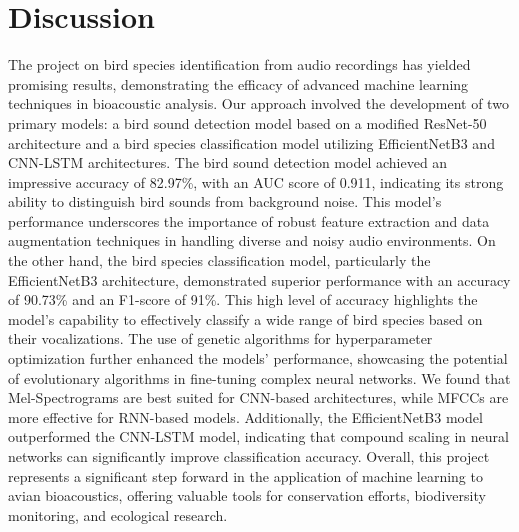 \newpage

\chapter{Discussion}
The project on bird species identification from audio recordings has yielded promising results, demonstrating the efficacy of advanced machine learning techniques in bioacoustic analysis. Our approach involved the development of two primary models: a bird sound detection model based on a modified ResNet-50 architecture and a bird species classification model utilizing EfficientNetB3 and CNN-LSTM architectures. The bird sound detection model achieved an impressive accuracy of 82.97\%, with an AUC score of 0.911, indicating its strong ability to distinguish bird sounds from background noise. This model's performance underscores the importance of robust feature extraction and data augmentation techniques in handling diverse and noisy audio environments. On the other hand, the bird species classification model, particularly the EfficientNetB3 architecture, demonstrated superior performance with an accuracy of 90.73\% and an F1-score of 91\%. This high level of accuracy highlights the model's capability to effectively classify a wide range of bird species based on their vocalizations. The use of genetic algorithms for hyperparameter optimization further enhanced the models' performance, showcasing the potential of evolutionary algorithms in fine-tuning complex neural networks. We found that Mel-Spectrograms are best suited for CNN-based architectures, while MFCCs are more effective for RNN-based models. Additionally, the EfficientNetB3 model outperformed the CNN-LSTM model, indicating that compound scaling in neural networks can significantly improve classification accuracy. Overall, this project represents a significant step forward in the application of machine learning to avian bioacoustics, offering valuable tools for conservation efforts, biodiversity monitoring, and ecological research.

